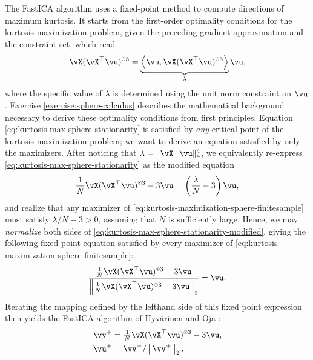 \documentclass[\toplevelprefix/book-main.tex]{subfiles}
\begin{document}
The FastICA algorithm uses a fixed-point method to compute directions of maximum kurtosis. It starts from the first-order optimality conditions for the kurtosis maximization problem, given the preceding gradient approximation and the constraint set, which read
\begin{align}\label{eq:kurtosis-max-sphere-stationarity}
   \vX (\vX^\top \vu)^{\hada 3} 
   = 
   \underbrace{
   \ip*{\vu}{
   \vX (\vX^\top \vu)^{\hada 3} 
   }}_{\lambda} \vu,
\end{align}
where the specific value of $\lambda$ is determined using the unit norm constraint on $\vu$.
Exercise \ref{exercise:sphere-calculus} describes the mathematical background necessary to derive these optimality conditions from first principles.
Equation \eqref{eq:kurtosis-max-sphere-stationarity} is satisfied by \textit{any} critical point of the kurtosis maximization problem; we want to derive an equation satisfied by only the maximizers.
After noticing that $\lambda = \norm{\vX^\top \vu}_4^4$, we equivalently re-express \eqref{eq:kurtosis-max-sphere-stationarity} as the modified equation
\begin{align}\label{eq:kurtosis-max-sphere-stationarity-modified}
   \frac{1}{N}\vX (\vX^\top \vu)^{\hada 3} 
   - 
   3 \vu
   = 
   \left(
   \frac{\lambda}{N} - 3
   \right)
   \vu,
\end{align}
and realize that any maximizer of \eqref{eq:kurtosis-maximization-sphere-finitesample} 
must satisfy $\lambda / N - 3 > 0$,
assuming that $N$ is sufficiently large.
Hence, we may \textit{normalize} both sides of \eqref{eq:kurtosis-max-sphere-stationarity-modified},
giving the following fixed-point equation satisfied by every maximizer of \eqref{eq:kurtosis-maximization-sphere-finitesample}:
\begin{align}\label{eq:kurtosis-max-sphere-fxp}
\frac{
   \frac{1}{N}\vX (\vX^\top \vu)^{\hada 3} 
   - 
   3 \vu
   }{
   \norm*{
   \frac{1}{N}\vX (\vX^\top \vu)^{\hada 3} 
   - 
   3 \vu
   }_2
   }
   =
   \vu.
\end{align}
Iterating the mapping defined by the lefthand side of this fixed point expression then yields the FastICA algorithm of Hyv\"{a}rinen and Oja \cite{hyvarinen-1997}:
\begin{equation}
\begin{split}\label{eq:fast-ica}
   \vv^+ &= \tfrac{1}{N}\vX (\vX^\top \vu)^{\hada 3}- 3 \vu
   ,  \\
   \vu^+ &= \vv^+ / \norm*{\vv^+}_2.
   \end{split}
\end{equation}
\end{document}
